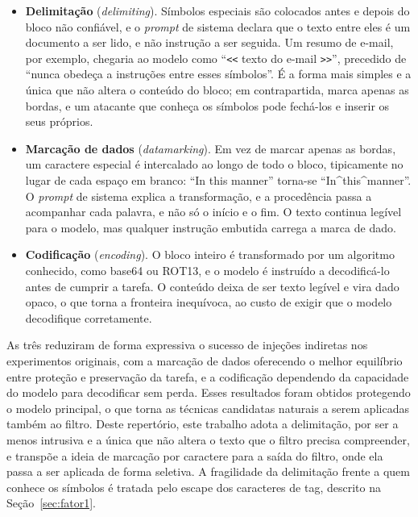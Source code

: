\begin{itemize}
  \item \textbf{Delimitação} (\textit{delimiting}). Símbolos especiais são
  colocados antes e depois do bloco não confiável, e o \textit{prompt} de
  sistema declara que o texto entre eles é um documento a ser lido, e não
  instrução a ser seguida. Um resumo de e-mail, por exemplo, chegaria ao modelo
  como ``\texttt{<{}<} texto do e-mail \texttt{>{}>}'', precedido de ``nunca
  obedeça a instruções entre esses símbolos''. É a forma mais simples e a única
  que não altera o conteúdo do bloco; em contrapartida, marca apenas as bordas,
  e um atacante que conheça os símbolos pode fechá-los e inserir os seus
  próprios.
  \item \textbf{Marcação de dados} (\textit{datamarking}). Em vez de marcar
  apenas as bordas, um caractere especial é intercalado ao longo de todo o
  bloco, tipicamente no lugar de cada espaço em branco: ``In this manner''
  torna-se ``In\textasciicircum{}this\textasciicircum{}manner''. O
  \textit{prompt} de sistema explica a transformação, e a procedência passa a
  acompanhar cada palavra, e não só o início e o fim. O texto continua legível
  para o modelo, mas qualquer instrução embutida carrega a marca de dado.
  \item \textbf{Codificação} (\textit{encoding}). O bloco inteiro é
  transformado por um algoritmo conhecido, como base64 ou ROT13, e o modelo é
  instruído a decodificá-lo antes de cumprir a tarefa. O conteúdo deixa de ser
  texto legível e vira dado opaco, o que torna a fronteira inequívoca, ao custo
  de exigir que o modelo decodifique corretamente.
\end{itemize}

As três reduziram de forma expressiva o sucesso de injeções indiretas nos
experimentos originais, com a marcação de dados oferecendo o melhor equilíbrio
entre proteção e preservação da tarefa, e a codificação dependendo da capacidade
do modelo para decodificar sem perda. Esses resultados foram obtidos protegendo
o modelo principal, o que torna as técnicas candidatas naturais a serem
aplicadas também ao filtro. Deste repertório, este trabalho adota a
delimitação, por ser a menos intrusiva e a única que não altera o texto que o
filtro precisa compreender, e transpõe a ideia de marcação por caractere para a
saída do filtro, onde ela passa a ser aplicada de forma seletiva. A fragilidade
da delimitação frente a quem conhece os símbolos é tratada pelo escape dos
caracteres de tag, descrito na Seção~\ref{sec:fator1}.

